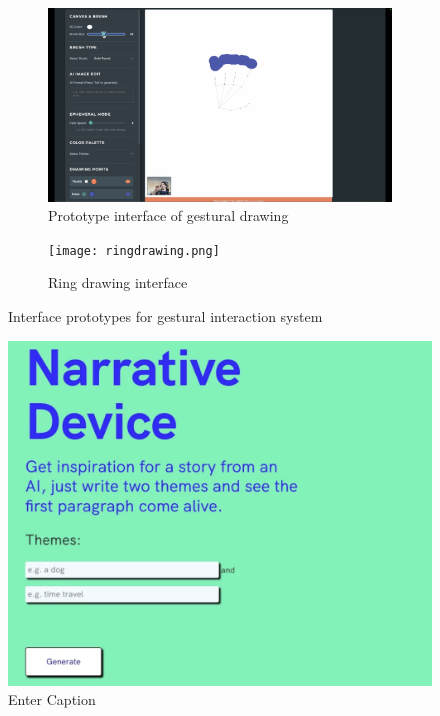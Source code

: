 \begin{figure}[htbp]
    \centering
    
    \begin{subfigure}[b]{1\textwidth}
        \centering
        \includegraphics[width=\textwidth]{gesturedraw.png}
        \caption{Prototype interface of gestural drawing}
        \label{fig:gesturedraw}
    \end{subfigure}
    \hfill
    
    \begin{subfigure}[b]{1\textwidth}
        \centering
        \texttt{[image: ringdrawing.png]}
        \caption{Ring drawing interface}
        \label{fig:ringdrawing}
    \end{subfigure}
    
    \caption{Interface prototypes for gestural interaction system}
    \label{fig:combined_interfaces}
\end{figure}

\begin{figure}
    \centering
    \includegraphics[width=1\linewidth]{narrativedeice.png}
    \caption{Enter Caption}
    \label{fig:enter-label}
\end{figure}

